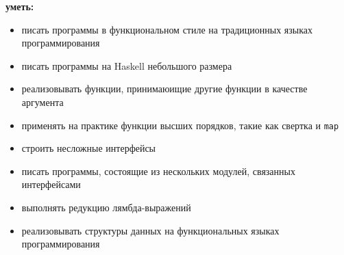 

\noindent\textbf{уметь:}
	\begin{itemize}[topsep=1mm]
		\item писать программы в функциональном стиле на традиционных языках программирования
		\item писать программы на Haskell небольшого размера
		\item реализовывать функции, принимаюищие другие функции в качестве аргумента
		\item применять на практике функции высших порядков, такие как свертка и \texttt{map}
		\item строить несложные интерфейсы
		\item писать программы, состоящие из нескольких модулей, связанных интерфейсами
		\item выполнять редукцию лямбда-выражений
		\item реализовывать структуры данных на функциональных языках программирования
	\end{itemize}

